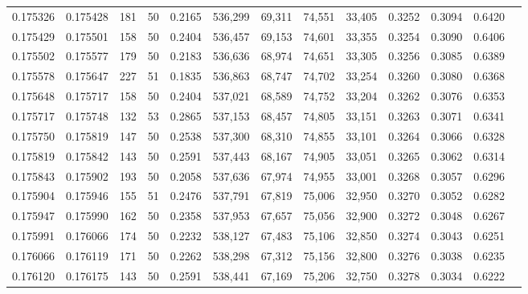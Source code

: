 \begin{tabular}{rrrrrrrrrrrrr}
0.175326 & 0.175428 &   181 &  50 &                                     0.2165 & 536,299 &  69,311 &  74,551 &  33,405 & 0.3252 & 0.3094 & 0.6420 \\
0.175429 & 0.175501 &   158 &  50 &                                     0.2404 & 536,457 &  69,153 &  74,601 &  33,355 & 0.3254 & 0.3090 & 0.6406 \\
0.175502 & 0.175577 &   179 &  50 &                                     0.2183 & 536,636 &  68,974 &  74,651 &  33,305 & 0.3256 & 0.3085 & 0.6389 \\
0.175578 & 0.175647 &   227 &  51 &                                     0.1835 & 536,863 &  68,747 &  74,702 &  33,254 & 0.3260 & 0.3080 & 0.6368 \\
0.175648 & 0.175717 &   158 &  50 &                                     0.2404 & 537,021 &  68,589 &  74,752 &  33,204 & 0.3262 & 0.3076 & 0.6353 \\
0.175717 & 0.175748 &   132 &  53 &                                     0.2865 & 537,153 &  68,457 &  74,805 &  33,151 & 0.3263 & 0.3071 & 0.6341 \\
0.175750 & 0.175819 &   147 &  50 &                                     0.2538 & 537,300 &  68,310 &  74,855 &  33,101 & 0.3264 & 0.3066 & 0.6328 \\
0.175819 & 0.175842 &   143 &  50 &                                     0.2591 & 537,443 &  68,167 &  74,905 &  33,051 & 0.3265 & 0.3062 & 0.6314 \\
0.175843 & 0.175902 &   193 &  50 &                                     0.2058 & 537,636 &  67,974 &  74,955 &  33,001 & 0.3268 & 0.3057 & 0.6296 \\
0.175904 & 0.175946 &   155 &  51 &                                     0.2476 & 537,791 &  67,819 &  75,006 &  32,950 & 0.3270 & 0.3052 & 0.6282 \\
0.175947 & 0.175990 &   162 &  50 &                                     0.2358 & 537,953 &  67,657 &  75,056 &  32,900 & 0.3272 & 0.3048 & 0.6267 \\
0.175991 & 0.176066 &   174 &  50 &                                     0.2232 & 538,127 &  67,483 &  75,106 &  32,850 & 0.3274 & 0.3043 & 0.6251 \\
0.176066 & 0.176119 &   171 &  50 &                                     0.2262 & 538,298 &  67,312 &  75,156 &  32,800 & 0.3276 & 0.3038 & 0.6235 \\
0.176120 & 0.176175 &   143 &  50 &                                     0.2591 & 538,441 &  67,169 &  75,206 &  32,750 & 0.3278 & 0.3034 & 0.6222 \\

\end{tabular}
